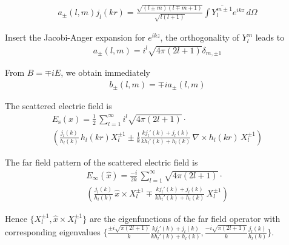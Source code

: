 \begin{align}
  a_\pm(l, m)j_l(kr) = \frac{\sqrt{(l\pm m)(l\mp m + 1)}}{\sqrt{l(l+1)}}\int \overline{Y_l^{m\pm 1}}e^{ikz}\,d\Omega
\end{align}

Insert the Jacobi-Anger expansion for $e^{ikz}$, the orthogonality of $Y_l^m$ leads to
\begin{align}
  a_\pm(l, m) = i^l\sqrt{4\pi(2l+1)}\delta_{m,\pm 1}
\end{align}

From $B=\mp iE$, we obtain immediately
\begin{align}
  b_\pm(l, m) = \mp i a_\pm(l, m)
\end{align}

The scattered electric field is
\begin{multline}
  E_\text{s}(x) = \frac{1}{2}\,\sum_{l=1}^\infty i^l\sqrt{4\pi(2l+1)}\cdot\\ \left(\frac{j_l(k)}{h_l(k)}\, h_l(kr)X_l^{\pm 1}\pm \frac{1}{k}\frac{kj_l'(k)+j_l(k)}{kh_l'(k)+h_l(k)}\,\nabla\times h_l(kr)\,X_l^{\pm 1}\right)
\end{multline}

The far field pattern of the scattered electric field is
\begin{multline}
  E_\infty(\hat{x}) = \frac{-i}{2k}\,\sum_{l=1}^\infty\sqrt{4\pi(2l+1)}\cdot\\ \left(\frac{j_l(k)}{h_l(k)}\,\hat{x}\times X_l^{\pm 1}\mp \frac{kj_l'(k)+j_l(k)}{kh_l'(k)+h_l(k)}\,X_l^{\pm 1}\right)
\end{multline}

Hence $\{X_l^{\pm 1}, \hat{x}\times X_l^{\pm 1}\}$ are the eigenfunctions of the far field operator with corresponding eigenvalues $\{\frac{\pm i\sqrt{\pi(2l+1)}}{k}\frac{kj_l'(k)+j_l(k)}{kh_l'(k)+h_l(k)}, \frac{-i\sqrt{\pi(2l+1)}}{k}\frac{j_l(k)}{h_l(k)}\}$.

